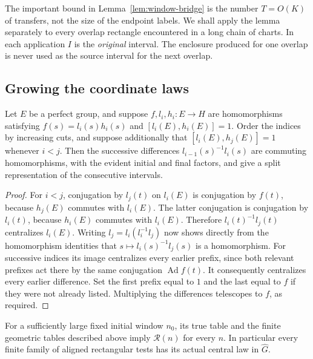 The important bound in Lemma~\ref{lem:window-bridge} is the number
$T=O(K)$ of transfers, not the size of the endpoint labels.  We shall
apply the lemma separately to every overlap rectangle encountered in
a long chain of charts.  In each application $I$ is the \emph{original}
interval.  The enclosure produced for one overlap is never used as
the source interval for the next overlap.

\subsection{Growing the coordinate laws}

\begin{lemma}\label{lem:nested-cuts}
Let $E$ be a perfect group, and suppose $f,l_i,h_i:E\to H$ are
homomorphisms satisfying $f(s)=l_i(s)h_i(s)$ and
$[l_i(E),h_i(E)]=1$.  Order the indices by increasing cuts, and
suppose additionally that $[l_i(E),h_j(E)]=1$ whenever $i<j$.
Then the successive differences $l_{i-1}(s)^{-1}l_i(s)$ are commuting
homomorphisms, with the evident initial and final factors, and give
a split representation of the consecutive intervals.
\end{lemma}

\begin{proof}
For $i<j$, conjugation by $l_j(t)$ on $l_i(E)$ is conjugation by
$f(t)$, because $h_j(E)$ commutes with $l_i(E)$.  The latter
conjugation is conjugation by $l_i(t)$, because $h_i(E)$ commutes
with $l_i(E)$.  Therefore $l_i(t)^{-1}l_j(t)$ centralizes $l_i(E)$.
Writing $l_j=l_i(l_i^{-1}l_j)$ now shows directly from the
homomorphism identities that $s\mapsto l_i(s)^{-1}l_j(s)$ is a
homomorphism.  For successive indices its image centralizes every
earlier prefix, since both relevant prefixes act there by the same
conjugation $\operatorname{Ad}f(t)$.  It consequently centralizes
every earlier difference.  Set the first prefix equal to $1$ and
the last equal to $f$ if they were not already listed.  Multiplying
the differences telescopes to $f$, as required.
\end{proof}

\begin{proposition}\label{prop:rectangular-law}
For a sufficiently large fixed initial window $n_0$, its true table
and the finite geometric tables described above imply
$\mathcal R(n)$ for every $n$.  In particular every finite family
of aligned rectangular tests has its actual central law in
$\widehat G$.
\end{proposition}

